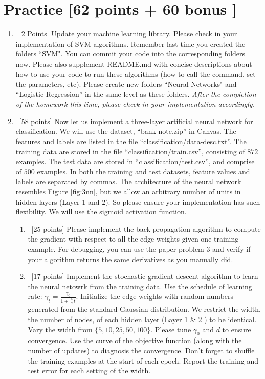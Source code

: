 \documentclass[12pt, fullpage,letterpaper]{article}
\begin{document}
\section{Practice [62 points + 60 bonus ]}
\begin{enumerate}
	\item~[2 Points] Update your machine learning library. Please check in your implementation of SVM algorithms. Remember last time you created the folders ``SVM". You can commit your code into the corresponding folders now. Please also supplement README.md with concise descriptions about how to use your code to run these algorithms (how to call the command, set the parameters, etc). Please create new folders ``Neural Networks" and ``Logistic Regression''  in the same level as these folders.  \textit{After the completion of the homework this time, please check in your implementation accordingly. }



	\item~[58 points] Now let us implement a three-layer artificial neural network for classification. We will use the dataset, ``bank-note.zip'' in Canvas. The features and labels are listed in the file ``classification/data-desc.txt''. The training data are stored in the file ``classification/train.csv'', consisting of $872$ examples. The test data are stored in ``classification/test.csv'', and comprise of $500$ examples. In both the training and test datasets, feature values and labels are separated by commas.
	The architecture of the neural network resembles Figure \ref{fig:3nn}, but we allow an arbitrary number of  units in hidden layers (Layer 1  and 2). So please ensure your implementation has such flexibility. We will use the sigmoid activation function. 

\begin{enumerate}
	\item ~[25 points] Please implement the back-propagation algorithm to compute the gradient with respect to all the edge weights given one training example.  For debugging, you can use the paper problem 3 and verify if your algorithm returns the same derivatives as you manually did. 
	
	\item~[17 points] Implement the stochastic gradient descent algorithm to learn the neural netowrk from the training data.  	Use the schedule of learning rate: $\gamma_t = \frac{\gamma_0}{1+\frac{\gamma_0}{d}t}	$.  Initialize the edge weights with random numbers generated from the standard Gaussian distribution. We restrict the width, \ie the number of nodes, of each hidden layer (\ie Layer 1 \& 2 ) to be identical.  Vary the width from $\{5, 10, 25, 50, 100\}$. Please tune $\gamma_0$ and $d$ to ensure convergence. Use the curve of the objective function (along with the number of updates) to diagnosis the convergence.  Don't forget to shuffle the training examples at the start of each epoch. Report the training and test error for each setting of the width.
	

\end{enumerate}
\end{enumerate}
\end{document}

